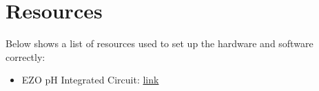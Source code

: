 \documentclass{article}
\begin{document}
    \section{Resources}
        \begin{flushleft}
            Below shows a list of resources used to set up the hardware and software correctly:
            \begin{itemize}
                \item EZO pH Integrated Circuit: \href{https://files.atlas-scientific.com/pH_EZO_Datasheet.pdf}{link}
            \end{itemize}
        \end{flushleft}
\end{document}
